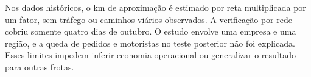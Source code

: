 Nos dados históricos, o km de aproximação é estimado por reta multiplicada por um fator, sem tráfego ou caminhos viários observados. A verificação por rede cobriu somente quatro dias de outubro. O estudo envolve uma empresa e uma região, e a queda de pedidos e motoristas no teste posterior não foi explicada. Esses limites impedem inferir economia operacional ou generalizar o resultado para outras frotas.
